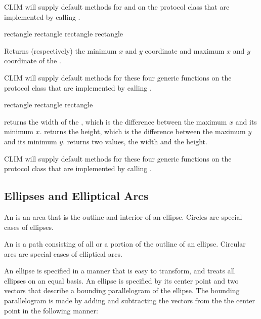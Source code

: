 CLIM will supply default methods for  and
 on the protocol class  that are
implemented by calling .


 {rectangle}
 {rectangle}
 {rectangle}
 {rectangle}

Returns (respectively) the minimum $x$ and $y$ coordinate and maximum $x$ and
$y$ coordinate of the  .

CLIM will supply default methods for these four generic functions on the
protocol class  that are implemented by calling
.


  {rectangle}
 {rectangle}
   {rectangle}

 returns the width of the  ,
which is the difference between the maximum $x$ and its minimum $x$.
 returns the height, which is the difference between the
maximum $y$ and its minimum $y$.   returns two values, the
width and the height.

CLIM will supply default methods for these four generic functions on the
protocol class  that are implemented by calling
.


\subsection {Ellipses and Elliptical Arcs}

An  is an area that is the outline and interior of an ellipse.
Circles are special cases of ellipses.

An  is a path consisting of all or a portion of the
outline of an ellipse.  Circular arcs are special cases of elliptical arcs.

An ellipse is specified in a manner that is easy to transform, and treats all
ellipses on an equal basis.  An ellipse is specified by its center point and two
vectors that describe a bounding parallelogram of the ellipse.  The bounding
parallelogram is made by adding and subtracting the vectors from the the center
point in the following manner:

